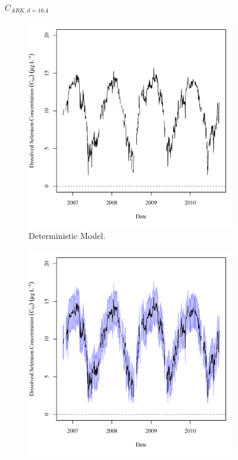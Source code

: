\begin{linenumbers}
\subfiguremid
\begin{landscape}
	\begin{figure}
		$ C_{ARK,d=16.4} $
		\begin{subfigure}{0.7\textwidth}
			\centering
			\includegraphics[width=\tableCustomSize]{"Figures/Results_USR/Deterministic/c TS FLS"}
			\caption{Deterministic Model.}
		\end{subfigure}%
		\begin{subfigure}{0.7\textwidth}
			\centering
			\includegraphics[width=\tableCustomSize]{"Figures/Results_USR/Stochastic/c TS FLS"}

\end{subfigure}
\end{figure}
\end{landscape}
\end{linenumbers}
